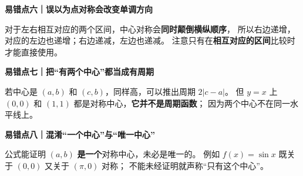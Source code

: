 \clearpage
\begin{trapbox}
\textbf{\textcolor{CTrap}{易错点六｜误以为点对称会改变单调方向}}


对于左右相互对应的两个区间，中心对称会\textbf{同时颠倒横纵顺序}，
所以右边递增，对应的左边也递增；右边递减，左边也递减。
注意只有在\textbf{相互对应的区间}比较时才能直接使用。

\medskip

\end{trapbox}
\clearpage
\begin{trapbox}
\textbf{\textcolor{CTrap}{易错点七｜把“有两个中心”都当成有周期}}


若中心是 $(a,b)$ 和 $(c,b)$，同样高，可以推出周期 $2|c-a|$。
但 $y=x$ 上 $(0,0)$ 和 $(1,1)$ 都是对称中心，\textbf{它并不是周期函数}；
因为两个中心不在同一水平线上。

\medskip

\end{trapbox}
\clearpage
\begin{trapbox}
\textbf{\textcolor{CTrap}{易错点八｜混淆“一个中心”与“唯一中心”}}


公式能证明 $(a,b)$ \textbf{是一个}对称中心，未必是唯一的。
例如 $f(x)=\sin x$ 既关于 $(0,0)$ 又关于 $(\pi,0)$ 对称；
不能未经证明就声称“只有这个中心”。
\end{trapbox}
